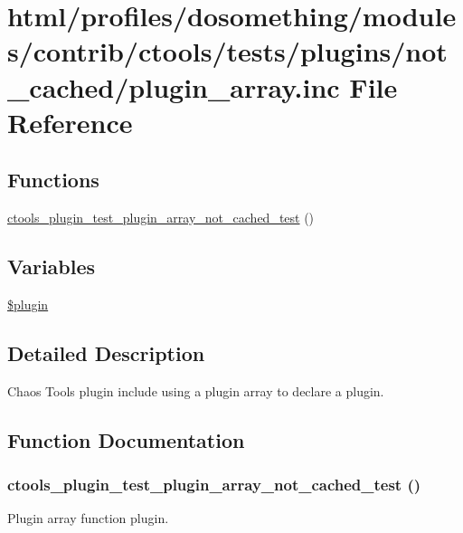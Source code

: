 \hypertarget{not__cached_2plugin__array_8inc}{
\section{html/profiles/dosomething/modules/contrib/ctools/tests/plugins/not\_\-cached/plugin\_\-array.inc File Reference}
\label{not__cached_2plugin__array_8inc}
}
\subsection*{Functions}
\begin{DoxyCompactItemize}
\item 
\hyperlink{not__cached_2plugin__array_8inc_a73710d04ea953c5cec91027857a45f91}{ctools\_\-plugin\_\-test\_\-plugin\_\-array\_\-not\_\-cached\_\-test} ()
\end{DoxyCompactItemize}
\subsection*{Variables}
\begin{DoxyCompactItemize}
\item 
\hyperlink{not__cached_2plugin__array_8inc_ada8a7130088351710bb02ed622d6bf65}{\$plugin}
\end{DoxyCompactItemize}


\subsection{Detailed Description}
Chaos Tools plugin include using a plugin array to declare a plugin. 

\subsection{Function Documentation}
\hypertarget{not__cached_2plugin__array_8inc_a73710d04ea953c5cec91027857a45f91}{
\subsubsection[{ctools\_\-plugin\_\-test\_\-plugin\_\-array\_\-not\_\-cached\_\-test}]{\setlength{\rightskip}{0pt plus 5cm}ctools\_\-plugin\_\-test\_\-plugin\_\-array\_\-not\_\-cached\_\-test ()}}
\label{not__cached_2plugin__array_8inc_a73710d04ea953c5cec91027857a45f91}
Plugin array function plugin. 

